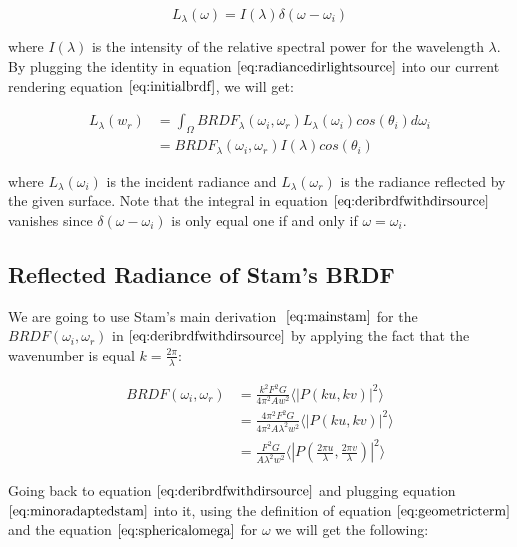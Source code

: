 \begin{equation}
 L_{\lambda}(\omega)=I(\lambda)\delta(\omega-\omega_i)
\label{eq:radiancedirlightsource}
\end{equation}

where $I(\lambda)$ is the intensity of the relative spectral power for the wavelength $\lambda$. By plugging the identity in equation $\ref{eq:radiancedirlightsource}$ into our current rendering equation $\ref{eq:initialbrdf}$, we will get:

\begin{align}
L_{\lambda}(w_r) 
& = \int_{\Omega} BRDF_{\lambda}(\omega_i, \omega_r) L_{\lambda}(\omega_i) cos(\theta_i) d\omega_i \nonumber \\
& = BRDF_{\lambda}(\omega_i, \omega_r) I(\lambda) cos(\theta_i)
\label{eq:deribrdfwithdirsource}
\end{align}

where $L_{\lambda}(\omega_i)$ is the incident radiance and $L_{\lambda}(\omega_r)$ is the radiance reflected by the given surface. Note that the integral in equation $\ref{eq:deribrdfwithdirsource}$ vanishes since $\delta(\omega-\omega_i)$ is only equal one if and only if $\omega = \omega_i$.

\subsection{Reflected Radiance of Stam's BRDF}
We are going to use Stam's main derivation $~\eqref{eq:mainstam}$ for the $BRDF(\omega_i, \omega_r)$ in $\ref{eq:deribrdfwithdirsource}$ by applying the fact that the wavenumber is equal $k=\frac{2\pi}{\lambda}$:

\begin{align}
BRDF(\omega_i, \omega_r) 
& = \frac{k^2 F^2 G}{4\pi^2 A w^2} \langle \left|P(ku, kv) \right|^2\rangle \nonumber\\
& = \frac{4 \pi^2 F^2 G}{4\pi^2 A \lambda^2 w^2} \langle \left|P(ku, kv)  \right|^2\rangle \nonumber\\
& = \frac{F^2 G}{A \lambda^2 w^2} \langle \left|P(\frac{2\pi u}{\lambda}, \frac{2\pi v}{\lambda})  \right|^2\rangle
\label{eq:minoradaptedstam}
\end{align}

Going back to equation $\ref{eq:deribrdfwithdirsource}$ and plugging equation $\ref{eq:minoradaptedstam}$ into it, using the definition of equation $\ref{eq:geometricterm}$ and the equation $\ref{eq:sphericalomega}$ for $\omega$ we will get the following:


